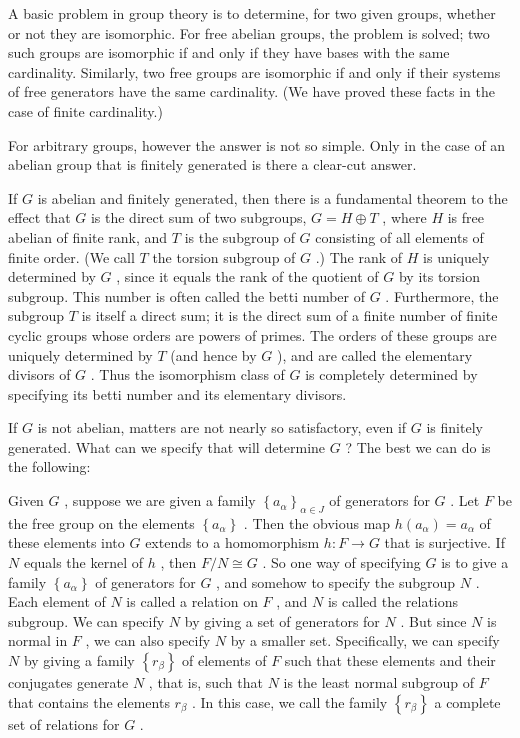 A basic problem in group theory is to determine, for two given groups, whether or not they are isomorphic. For free abelian groups, the problem is solved; two such groups are isomorphic if and only if they have bases with the same cardinality. Similarly, two free groups are isomorphic if and only if their systems of free generators have the same cardinality. (We have proved these facts in the case of finite cardinality.)

For arbitrary groups, however the answer is not so simple. Only in the case of an abelian group that is finitely generated is there a clear-cut answer.

If \(G\) is abelian and finitely generated, then there is a fundamental theorem to the effect that \(G\) is the direct sum of two subgroups, \(G = H \oplus  T\) , where \(H\) is free abelian of finite rank, and \(T\) is the subgroup of \(G\) consisting of all elements of finite order. (We call \(T\) the torsion subgroup of \(G\) .) The rank of \(H\) is uniquely determined by \(G\) , since it equals the rank of the quotient of \(G\) by its torsion subgroup. This number is often called the betti number of \(G\) . Furthermore, the subgroup \(T\) is itself a direct sum; it is the direct sum of a finite number of finite cyclic groups whose orders are powers of primes. The orders of these groups are uniquely determined by \(T\) (and hence by \(G\) ), and are called the elementary divisors of \(G\) . Thus the isomorphism class of \(G\) is completely determined by specifying its betti number and its elementary divisors.

If \(G\) is not abelian, matters are not nearly so satisfactory, even if \(G\) is finitely generated. What can we specify that will determine \(G\) ? The best we can do is the following:

Given \(G\) , suppose we are given a family \({\left\{  {a}_{\alpha }\right\}  }_{\alpha  \in  J}\) of generators for \(G\) . Let \(F\) be the free group on the elements \(\left\{  {a}_{\alpha }\right\}\) . Then the obvious map \(h\left( {a}_{\alpha }\right)  = {a}_{\alpha }\) of these elements into \(G\) extends to a homomorphism \(h : F \rightarrow  G\) that is surjective. If \(N\) equals the kernel of \(h\) , then \(F/N \cong  G\) . So one way of specifying \(G\) is to give a family \(\left\{  {a}_{\alpha }\right\}\) of generators for \(G\) , and somehow to specify the subgroup \(N\) . Each element of \(N\) is called a relation on \(F\) , and \(N\) is called the relations subgroup. We can specify \(N\) by giving a set of generators for \(N\) . But since \(N\) is normal in \(F\) , we can also specify \(N\) by a smaller set. Specifically, we can specify \(N\) by giving a family \(\left\{  {r}_{\beta }\right\}\) of elements of \(F\) such that these elements and their conjugates generate \(N\) , that is, such that \(N\) is the least normal subgroup of \(F\) that contains the elements \({r}_{\beta }\) . In this case, we call the family \(\left\{  {r}_{\beta }\right\}\) a complete set of relations for \(G\) .

